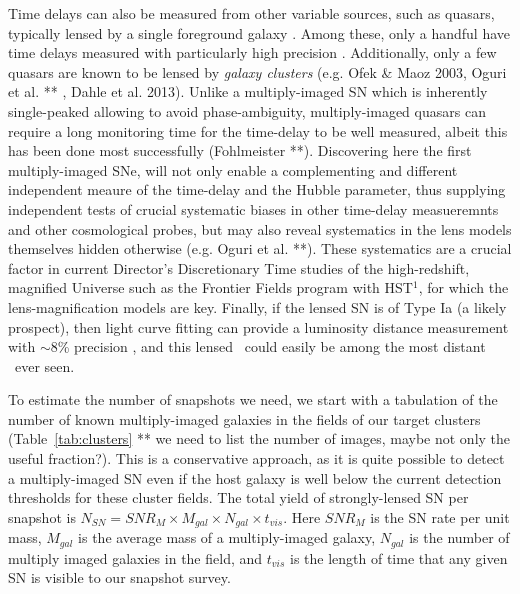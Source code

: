 Time delays can also be measured from other variable sources, such as quasars,
typically lensed by a single foreground galaxy \citep{Jackson:2007}. Among
these, only a handful have time delays measured with particularly high
precision \citep[e.g.][]{Suyu:2010,Suyu:2013}. Additionally, only a few quasars are known to be lensed by \emph{galaxy clusters} (e.g. Ofek \& Maoz 2003, Oguri et al. ** , Dahle et al. 2013). Unlike a multiply-imaged SN which is inherently single-peaked allowing to avoid phase-ambiguity, multiply-imaged quasars can require a long monitoring time for the time-delay to be well measured, albeit this has been done most successfully (Fohlmeister **). Discovering here the first multiply-imaged SNe, will not only enable a complementing and different independent meaure of the time-delay and the Hubble parameter, thus supplying independent tests of crucial systematic biases in other time-delay measueremnts and other cosmological probes, but may also reveal systematics in the lens models themselves hidden otherwise (e.g. Oguri et al. **). These systematics are a crucial factor in current Director's Discretionary Time studies of the high-redshift, magnified Universe such as the Frontier Fields program with HST${^1}$, for which the lens-magnification models are key. Finally, if the lensed SN is of Type Ia (a likely prospect), then light curve fitting can provide a luminosity distance measurement with $\sim$8\% precision \citep{Phillips:1993}, and this lensed \SNIa\ could easily
be among the most distant \SNIa\ ever seen.


\medskip
{} To estimate the number of snapshots we need, we start with a
tabulation of the number of known multiply-imaged galaxies in the
fields of our target clusters (Table~\ref{tab:clusters} ** we need to list the number of images, maybe not only the useful fraction?).  This is a
conservative approach, as it is quite possible to detect a
multiply-imaged SN even if the host galaxy is well below the current
detection thresholds for these cluster fields. The total yield of
strongly-lensed SN per snapshot is 
$N_{SN} = SNR_{M} \times M_{gal} \times N_{gal} \times t_{vis}$. 
Here $SNR_M$ is the SN rate per unit mass, $M_{gal}$ is
the average mass of a multiply-imaged galaxy, $N_{gal}$ is the number
of multiply imaged galaxies in the field, and $t_{vis}$ is the length
of time that any given SN is visible to our snapshot survey.  

